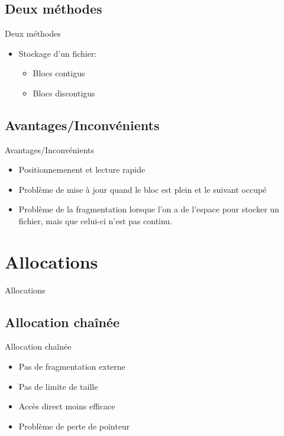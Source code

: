 \section{\sectitle}
\begin{frame}{\sectitle}
\def\subsectitle{Deux méthodes}
\subsection{\subsectitle}
\begin{block}{\subsectitle}
\begin{itemize}
    \item Stockage d'un fichier:
        \begin{itemize}
            \item Blocs contigus
            \item Blocs discontigus
        \end{itemize}
\end{itemize}
\end{block}


\def\subsectitle{Avantages/Inconvénients}
\subsection{\subsectitle}
\begin{block}{\subsectitle}
    \begin{itemize}
        \item Positionnemenent et lecture rapide
        \item Problème de mise à jour quand le bloc est plein et le suivant
            occupé
        \item Problème de la fragmentation lorsque l'on a de l'espace pour
            stocker un fichier, mais que celui-ci n'est pas continu.
    \end{itemize}
\end{block}
\end{frame}


\def\sectitle{Allocations}
\section{\sectitle}
\begin{frame}{\sectitle}
\def\subsectitle{Allocation chaînée}
\subsection{\subsectitle}
\begin{block}{\subsectitle}
\begin{itemize}
    \item Pas de fragmentation externe
    \item Pas de limite de taille
    \item Accès direct moins efficace
    \item Problème de perte de pointeur
\end{itemize}
\end{block}
\end{frame}


